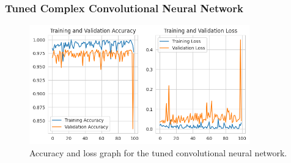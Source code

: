 \subsubsection{Tuned Complex Convolutional Neural Network}

\begin{figure}[ht]
    \centering
    \includegraphics[width=0.85\textwidth]{./img/cnn/tuned/accuracy-loss-graph}
    \caption{Accuracy and loss graph for the tuned convolutional neural network.}
    \label{fig:cnn-tuned-accuracy-loss-graph}
\end{figure}


